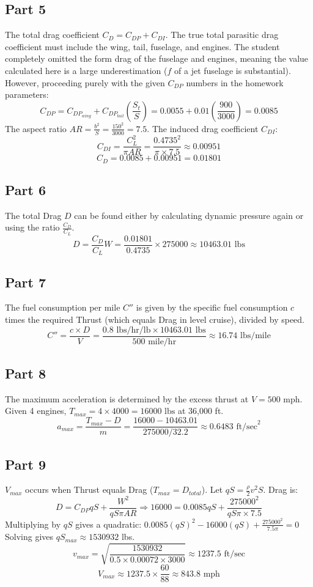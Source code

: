 \documentclass{KPS_assignment}
\begin{document}
\subsection*{Part 5}
The total drag coefficient $C_D = C_{DP} + C_{DI}$.
The true total parasitic drag coefficient must include the wing, tail, fuselage, and engines. The student completely omitted the form drag of the fuselage and engines, meaning the value calculated here is a large underestimation ($f$ of a jet fuselage is substantial).
However, proceeding purely with the given $C_{DP}$ numbers in the homework parameters:
$$ C_{DP} = C_{DP_{wing}} + C_{DP_{tail}} \left( \frac{S_t}{S} \right) = 0.0055 + 0.01 \left( \frac{900}{3000} \right) = 0.0085 $$
The aspect ratio $AR = \frac{b^2}{S} = \frac{150^2}{3000} = 7.5$.
The induced drag coefficient $C_{DI}$:
$$ C_{DI} = \frac{C_L^2}{\pi AR} = \frac{0.4735^2}{\pi \times 7.5} \approx 0.00951 $$
$$ C_D = 0.0085 + 0.00951 = 0.01801 $$

\subsection*{Part 6}
The total Drag $D$ can be found either by calculating dynamic pressure again or using the ratio $\frac{C_D}{C_L}$.
$$ D = \frac{C_D}{C_L} W = \frac{0.01801}{0.4735} \times 275000 \approx 10463.01 \text{ lbs} $$

\subsection*{Part 7}
The fuel consumption per mile $C''$ is given by the specific fuel consumption $c$ times the required Thrust (which equals Drag in level cruise), divided by speed.
$$ C'' = \frac{c \times D}{V} = \frac{0.8 \text{ lbs/hr/lb} \times 10463.01 \text{ lbs}}{500 \text{ mile/hr}} \approx 16.74 \text{ lbs/mile} $$

\subsection*{Part 8}
The maximum acceleration is determined by the excess thrust at $V=500 \text{ mph}$.
Given 4 engines, $T_{max} = 4 \times 4000 = 16000 \text{ lbs}$ at 36,000 ft.
$$ a_{max} = \frac{T_{max} - D}{m} = \frac{16000 - 10463.01}{275000 / 32.2} \approx 0.6483 \text{ ft/sec}^2 $$

\subsection*{Part 9}
$V_{max}$ occurs when Thrust equals Drag ($T_{max} = D_{total}$). Let $qS = \frac{\rho}{2} v^2 S$. Drag is:
$$ D = C_{DP} qS + \frac{W^2}{qS \pi AR} \Rightarrow 16000 = 0.0085 qS + \frac{275000^2}{qS \pi \times 7.5} $$
Multiplying by $qS$ gives a quadratic: 
$ 0.0085 (qS)^2 - 16000 (qS) + \frac{275000^2}{7.5 \pi} = 0 $ 
Solving gives $qS_{max} \approx 1530932$ lbs.
$$ v_{max} = \sqrt{ \frac{1530932}{0.5 \times 0.00072 \times 3000} } \approx 1237.5 \text{ ft/sec} $$
$$ V_{max} \approx 1237.5 \times \frac{60}{88} \approx 843.8 \text{ mph} $$
\end{document}

